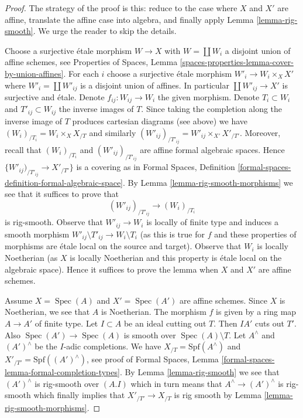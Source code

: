 \documentclass{stacks-project}
\theoremstyle{plain}
\theoremstyle{definition}
\theoremstyle{remark}
\numberwithin{equation}{subsection}
\def\Spec{\mathop{\mathrm{Spec}}}
\begin{document}
\begin{proof}
The strategy of the proof is this: reduce to the case where $X$ and $X'$
are affine, translate the affine case into algebra, and finally apply
Lemma \ref{lemma-rig-smooth}. We urge the reader to skip the details.

\medskip\noindent
Choose a surjective \'etale morphism $W \to X$ with $W = \coprod W_i$
a disjoint union of affine schemes, see Properties of Spaces, Lemma
\ref{spaces-properties-lemma-cover-by-union-affines}.
For each $i$ choose a surjective \'etale morphism $W'_i \to W_i \times_X X'$
where $W'_i = \coprod W'_{ij}$ is a disjoint union of affines.
In particular $\coprod W'_{ij} \to X'$ is surjective and \'etale.
Denote $f_{ij} : W_{ij} \to W_i$ the given morphism.
Denote $T_i \subset W_i$ and $T'_{ij} \subset W_{ij}$ the inverse
images of $T$. Since taking the completion along the inverse
image of $T$ produces cartesian diagrams (see above) we
have $(W_i)_{/T_i} = W_i \times_X X_{/T}$ and similarly
$(W'_{ij})_{/T'_{ij}} = W'_{ij} \times_{X'} X'_{/T'}$.
Moreover, recall that $(W_i)_{/T_i}$ and $(W'_{ij})_{/T'_{ij}}$
are affine formal algebraic spaces.
Hence $\{W'_{ij})_{/T'_{ij}} \to X'_{/T'}\}$ is a covering
as in Formal Spaces, Definition
\ref{formal-spaces-definition-formal-algebraic-space}.
By Lemma \ref{lemma-rig-smooth-morphisms}
we see that it suffices to prove that
$$
(W'_{ij})_{/T'_{ij}} \longrightarrow (W_i)_{/T_i}
$$
is rig-smooth. Observe that $W'_{ij} \to W_i$
is locally of finite type and induces a smooth morphism
$W'_{ij} \setminus T'_{ij} \to W_i \setminus T_i$
(as this is true for $f$ and these properties of morphisms are
\'etale local on the source and target).
Observe that $W_i$ is locally Noetherian (as $X$ is locally Noetherian
and this property is \'etale local on the algebraic space).
Hence it suffices to prove the lemma when
$X$ and $X'$ are affine schemes.

\medskip\noindent
Assume $X = \Spec(A)$ and $X' = \Spec(A')$ are affine schemes.
Since $X$ is Noetherian, we see that $A$ is Noetherian.
The morphism $f$ is given by a ring map $A \to A'$ of finite type.
Let $I \subset A$ be an ideal cutting out $T$. Then $IA'$ cuts out $T'$.
Also $\Spec(A') \to \Spec(A)$ is smooth over $\Spec(A) \setminus T$.
Let $A^\wedge$ and $(A')^\wedge$ be the $I$-adic
completions. We have $X_{/T} = \text{Spf}(A^\wedge)$ and
$X'_{/T'} = \text{Spf}((A')^\wedge)$, see proof of
Formal Spaces, Lemma
\ref{formal-spaces-lemma-formal-completion-types}.
By Lemma \ref{lemma-rig-smooth} we see that
$(A')^\wedge$ is rig-smooth over $(A. I)$
which in turn means that $A^\wedge \to (A')^\wedge$ is rig-smooth which
finally implies that $X'_{/T'} \to X_{/T}$ is rig smooth by
Lemma \ref{lemma-rig-smooth-morphisms}.
\end{proof}
\end{document}
